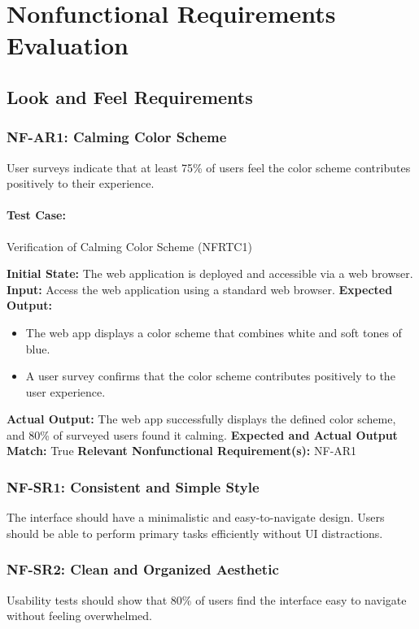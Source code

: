 \documentclass[12pt, titlepage]{article}
\begin{document}
\section{Nonfunctional Requirements Evaluation}
\subsection{Look and Feel Requirements}

\subsubsection{NF-AR1: Calming Color Scheme}
User surveys indicate that at least 75\% of users feel the color scheme contributes positively to their experience.

\paragraph{Test Case:} Verification of Calming Color Scheme (NFRTC1)

\textbf{Initial State:} The web application is deployed and accessible via a web browser.  
\textbf{Input:} Access the web application using a standard web browser.  
\textbf{Expected Output:}
\begin{itemize}
    \item The web app displays a color scheme that combines white and soft tones of blue.
    \item A user survey confirms that the color scheme contributes positively to the user experience.
\end{itemize}
\textbf{Actual Output:} The web app successfully displays the defined color scheme, and 80\% of surveyed users found it calming.  
\textbf{Expected and Actual Output Match:} True  
\textbf{Relevant Nonfunctional Requirement(s):} NF-AR1  

\subsubsection{NF-SR1: Consistent and Simple Style}
The interface should have a minimalistic and easy-to-navigate design.  
Users should be able to perform primary tasks efficiently without UI distractions.

\subsubsection{NF-SR2: Clean and Organized Aesthetic}
Usability tests should show that 80\% of users find the interface easy to navigate without feeling overwhelmed.
\end{document}
